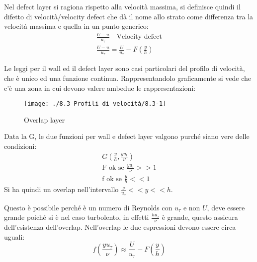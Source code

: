 Nel defect layer si ragiona rispetto alla velocità massima, si definisce quindi il difetto di velocità/velocity defect che dà il nome allo strato come differenza tra la velocità massima e quella in un punto generico:
%
	\begin{equation*}
		\begin{gathered}
			\frac{U - u}{u_\tau} \quad \text{Velocity defect}\\
			\frac{U - u}{u_\tau} = \frac{U}{u_\tau} - F \left( \frac{y}{h} \right)
		\end{gathered}
	\end{equation*}
%

Le leggi per il wall ed il defect layer sono casi particolari del profilo di velocità, che è unico ed una funzione continua.
Rappresentandolo graficamente si vede che c'è una zona in cui devono valere ambedue le rappresentazioni:
	\begin{figure}[ht]
		\texttt{[image: ./8.3 Profili di velocità/8.3-1]}
		\centering
		\caption{Overlap layer}
	\end{figure}
%

Data la G, le due funzioni per wall e defect layer valgono purché siano vere delle condizioni:
%
	\begin{equation*}
		\begin{gathered}
			G\left( \frac{y}{h}, \frac{y u_t}{\nu} \right)\\
			\text{F  ok se } \frac{y u_\tau}{\nu} >> 1\\  
			\text{f  ok se } \frac{y}{h} << 1
		\end{gathered}
	\end{equation*}
%
Si ha quindi un overlap nell'intervallo $\frac{\nu}{u_\tau} << y << h$.

Questo è possibile perché è un numero di Reynolds con $u_\tau$ e non $U$, deve essere grande poiché si è nel caso turbolento, in effetti $\frac{h u_\tau}{\nu}$ è grande, questo assicura dell'esistenza dell'overlap.
Nell'overlap le due espressioni devono essere circa uguali:
%
	\begin{equation*}
		f\left( \frac{y u_\tau}{\nu} \right) \approx \frac{U}{u_\tau} - F \left( \frac{y}{h} \right)
	\end{equation*}
%


